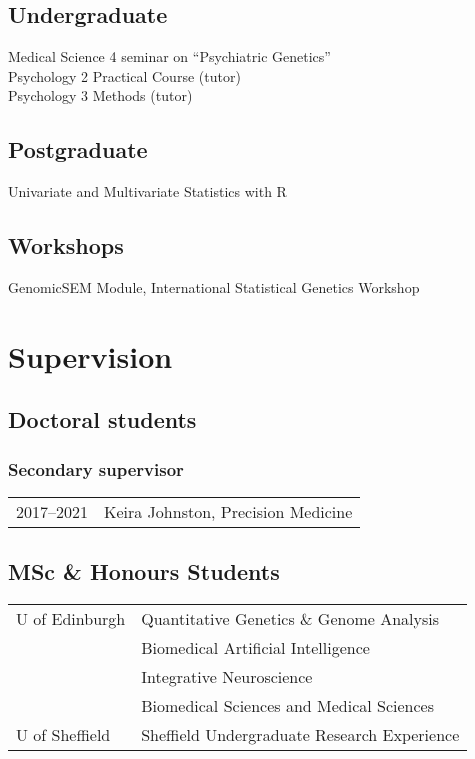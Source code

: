 \documentclass[11pt]{article}
\begin{document}
\subsection*{Undergraduate}

Medical Science 4 seminar on ``Psychiatric Genetics'' \\ 
Psychology 2 Practical Course (tutor) \\
Psychology 3 Methods (tutor)

\subsection*{Postgraduate}

Univariate and Multivariate Statistics with R 

\subsection*{Workshops}

GenomicSEM Module, International Statistical Genetics Workshop

\section*{Supervision}

\subsection*{Doctoral students}

\subsubsection*{Secondary supervisor}

\begin{tabular}{p{3cm}p{12cm}}

2017--2021 & Keira Johnston, Precision Medicine

\end{tabular}

\subsection*{MSc \& Honours Students}

\begin{tabular}{p{3cm}p{12cm}}
U of Edinburgh & Quantitative Genetics \& Genome Analysis \\
& Biomedical Artificial Intelligence \\
& Integrative Neuroscience \\
& Biomedical Sciences and Medical Sciences \\
U of Sheffield & Sheffield Undergraduate Research Experience 
\end{tabular}
\end{document}
